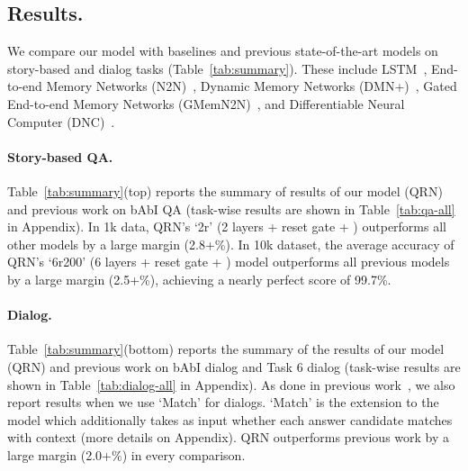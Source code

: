 \documentclass[table]{article}
\begin{document}
\subsection{Results.}\label{subsec:results}
We compare our model with baselines and previous state-of-the-art models on story-based and dialog tasks (Table~\ref{tab:summary}). 
These include LSTM~\citep{lstm}, End-to-end Memory Networks (N2N)~\citep{memN2N}, Dynamic Memory Networks (DMN+)~\citep{DMN+}, Gated End-to-end Memory Networks (GMemN2N)~\citep{perez2016gated}, and Differentiable Neural Computer (DNC)~\citep{graves2016hybrid}. 

\paragraph{Story-based QA.} Table~\ref{tab:summary}(top) reports the summary of results of our model (QRN) and previous work on bAbI QA
(task-wise results are shown in Table~\ref{tab:qa-all} in Appendix).
In 1k data, QRN's `2r' (2 layers + reset gate + ) outperforms all other models by a large margin (2.8+\%).
In 10k dataset, the average accuracy of QRN's `6r200' (6 layers + reset gate + ) model outperforms all previous models by a large margin (2.5+\%), achieving a nearly perfect score of 99.7\%.

\paragraph{Dialog.}
 Table~\ref{tab:summary}(bottom) reports the summary of the results of our model (QRN) and previous work on bAbI dialog and Task 6 dialog (task-wise results are shown in Table~\ref{tab:dialog-all} in Appendix).
As done in previous work~\citep{bordes2016learning, perez2016gated}, we also report results when we use `Match' for dialogs. `Match' is the extension to the model which additionally takes as input whether each answer candidate matches with context (more details on Appendix).  QRN outperforms  previous work by a large margin (2.0+\%) in every comparison.
\end{document}
